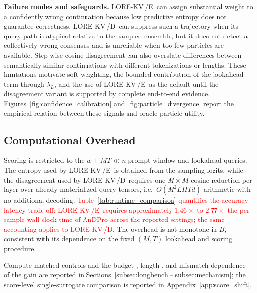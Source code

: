 \documentclass{article} %
\newcommand{\lorekvE}{LORE-KV\,/E}
\newcommand{\lorekvD}{LORE-KV\,/D}
\begin{document}
\textbf{Failure modes and safeguards.}
\lorekvE\ can assign substantial weight to a confidently wrong continuation because low predictive entropy does not guarantee correctness. \lorekvD\ can suppress such a trajectory when its query path is atypical relative to the sampled ensemble, but it does not detect a collectively wrong consensus and is unreliable when too few particles are available. Step-wise cosine disagreement can also overstate differences between semantically similar continuations with different tokenizations or lengths. These limitations motivate soft weighting, the bounded contribution of the lookahead term through $\lambda_L$, and the use of \lorekvE\ as the default until the disagreement variant is supported by complete end-to-end evidence. Figures~\ref{fig:confidence_calibration} and~\ref{fig:particle_divergence} report the empirical relation between these signals and oracle particle utility.

\subsection{Computational Overhead} \label{app:overhead_details}

Scoring is restricted to the $w+MT\ll n$ prompt-window and lookahead queries. The entropy used by \lorekvE\ is obtained from the sampling logits, while the disagreement used by \lorekvD\ requires one $M\times M$ cosine reduction per layer over already-materialized query tensors, i.e.\ $O(M^2LHTd)$ arithmetic with no additional decoding. \textcolor{red}{Table~\ref{tab:runtime_comparison} quantifies the accuracy--latency trade-off: \lorekvE\ requires approximately $1.46\times$ to $2.77\times$ the per-sample wall-clock time of AnDPro across the reported settings; the same accounting applies to \lorekvD.} The overhead is not monotone in $B$, consistent with its dependence on the fixed $(M,T)$ lookahead and scoring procedure.

Compute-matched controls and the budget-, length-, and mismatch-dependence of the gain are reported in Sections~\ref{subsec:longbench}--\ref{subsec:mechanism}; the score-level single-surrogate comparison is reported in Appendix~\ref{app:score_shift}.


\label{app:expected_attention}
\end{document}
